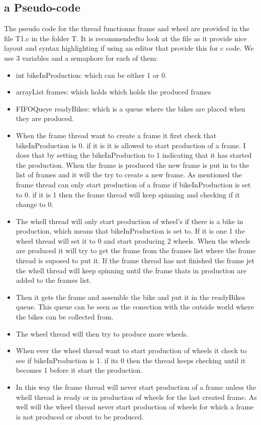 \documentclass[a4paper,12pt,danish]{report}
\begin{document}
\subsection{a Pseudo-code}
The pseudo code for the thread functionns frame and wheel are provided in the
file T1.c in the folder T. It is recommendedto look at the file as it provide
nice layout and syntax highlighting if using an editor that provide this for c
code. We use 3 variables and a semaphore for each of them:
\begin{itemize}
  \item int bikeInProduction: which can be either 1 or 0.
  \item arrayList frames: which holds which holds the produced frames
  \item FIFOQueye readyBikes: which is a queue where the bikes are placed when
  they are produced.
  \item When the frame thread want to create a frame it first check that
  bikeInProduction is 0. if it is it is allowed to start production of a frame.
  I does that by setting the bikeInProduction to 1 indicating that it has started
  the production. When the frame is produced the new frame is put in to the list
  of frames and it will the try to create a new frame. As mentioned the
  frame thread can only start production of a frame if bikeInProduction is
  set to 0. if it is 1 then the frame thread will keep spinning and
  checking if it change to 0.
  \item The whell thread will only start production of wheel's if there is a
  bike in production, which means that bikeInProduction is set to. If it is one
  1 the wheel thread will set it to 0 and start producing 2 wheels. When the
  wheels are produced it will try to get the frame from the frames list where
  the frame thread is suposed to put it. If the frame thread has not finished
  the frame jet the whell thread will keep spinning until the frame thats in
  production are added to the frames list.
  \item Then it gets the frame and assemble the bike and put it in the readyBikes
  queue. This queue can be seen as the conection with the outside world where
  the bikes can be collected from.
  \item The wheel thread will then try to produce more wheels.
  \item When ever the wheel thread want to start production of wheels it check to
  see if bikeInProduction is 1. if its 0 then the thread keeps checking until it
  becomes 1 before it start the production.
  \item In this way the frame thread will  never start production of a frame
  unless the whell thread is ready or in production of wheels for the last
  created frame. As well will the wheel thread never start production of wheels
  for which a frame is not produced or about to be produced.
\end{itemize}
  
\end{document}
